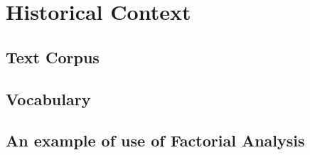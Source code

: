 \documentclass[runningheads,a4paper]{llncs}
\begin{document}
\section{Historical Context}

\subsection{Text Corpus}

\subsection{Vocabulary}

\subsection{An example of use of Factorial Analysis}
\end{document}

